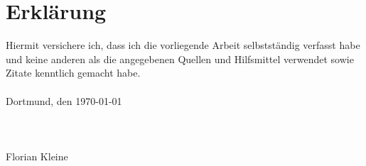 \cleardoublepage
\normalsize
\section*{Erklärung}

Hiermit versichere ich, dass ich die vorliegende Arbeit selbstständig verfasst habe und keine anderen als die angegebenen Quellen und Hilfsmittel verwendet sowie Zitate kenntlich gemacht habe.\\\\
Dortmund, den \today \\\\\\\\
Florian Kleine
